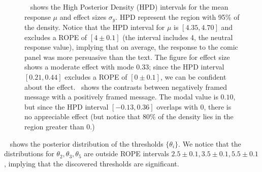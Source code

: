 \begin{figure}
  \hfill
 \caption{~ shows the High Posterior Density (HPD) intervals for the mean response $\mu$ and effect sizes $\sigma_y$. HPD represent the region with 95\% of the density. Notice that the HPD interval for $\mu$ is $[4.35, 4.70]$ and excludes a ROPE of $[4\pm 0.1]$ (the interval includes 4, the neutral response value), implying that on average, the response to the comic panel was more persuasive than the text. The figure for effect size shows a moderate effect with mode $0.33$; since the HPD interval $[0.21, 0.44]$ excludes a ROPE of $[0\pm 0.1]$, we can be confident about the effect.~ shows the contrasts between negatively framed message with a positively framed message. The modal value is $0.10$, but since the HPD interval $[-0.13, 0.36]$ overlaps with 0, there is no appreciable effect (but notice that 80\% of the density lies in the region greater than 0.)}
 \label{fig:main-experiment-effect}
\end{figure}

~ shows the posterior distribution of the thresholds $\{\theta_i\}$. We notice that the distributions for $\theta_2, \theta_3, \theta_5$ are outside  ROPE intervals $2.5 \pm 0.1, 3.5 \pm 0.1, 5.5 \pm 0.1$, implying that the discovered thresholds are significant.

